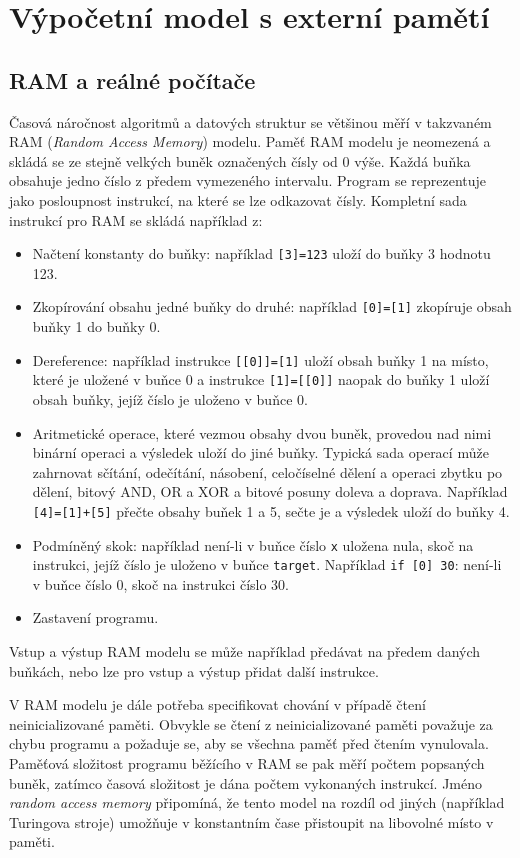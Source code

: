 \def\O{\mathcal{O}} %

\chapter{Výpočetní model s externí pamětí}
\section{RAM a reálné počítače}

Časová náročnost algoritmů a datových struktur se většinou měří v takzvaném
RAM (\textit{Random Access Memory}) modelu. Paměť RAM modelu je neomezená a
skládá se ze stejně velkých buněk označených čísly od 0 výše. Každá buňka
obsahuje jedno číslo z předem vymezeného intervalu. Program se reprezentuje
jako posloupnost instrukcí, na které se lze odkazovat čísly. Kompletní sada
instrukcí pro RAM se skládá například z:
\begin{itemize}
\item
	Načtení konstanty do buňky: například \texttt{[3]=123} uloží do buňky
	3 hodnotu 123.
\item
	Zkopírování obsahu jedné buňky do druhé: například \texttt{[0]=[1]}
	zkopíruje obsah buňky 1 do buňky 0.
\item
	Dereference: například instrukce \texttt{[[0]]=[1]} uloží obsah
	buňky 1 na místo, které je uložené v buňce 0 a instrukce
	\texttt{[1]=[[0]]} naopak do buňky 1 uloží obsah buňky, jejíž
	číslo je uloženo v buňce 0.
\item
	Aritmetické operace, které vezmou obsahy dvou buněk,
	provedou nad nimi binární operaci a výsledek uloží do jiné buňky.
	Typická sada operací může zahrnovat sčítání, odečítání, násobení,
	celočíselné dělení a operaci zbytku po dělení, bitový AND, OR a XOR a
	bitové posuny doleva a doprava.
	Například \texttt{[4]=[1]+[5]} přečte obsahy buňek 1 a 5, sečte je a
	výsledek uloží do buňky 4.
\item
	Podmíněný skok: například není-li v buňce číslo \texttt{x}
	uložena nula, skoč na instrukci, jejíž číslo je uloženo v buňce
	\texttt{target}. Například \texttt{if [0] 30}: není-li v buňce číslo
	0, skoč na instrukci číslo 30.
\item
	Zastavení programu.
\end{itemize}

Vstup a výstup RAM modelu se může například předávat na předem daných buňkách,
nebo lze pro vstup a výstup přidat další instrukce.

V RAM modelu je dále potřeba specifikovat chování v případě čtení
neinicializované paměti. Obvykle se čtení z neinicializované paměti považuje
za chybu programu a požaduje se, aby se všechna paměť před čtením
vynulovala.
Paměťová složitost programu běžícího v RAM se pak měří počtem popsaných buněk,
zatímco časová složitost je dána počtem vykonaných instrukcí.
Jméno \textit{random access memory} připomíná, že tento model na rozdíl od
jiných (například Turingova stroje) umožňuje v konstantním čase přistoupit
na libovolné místo v paměti.

